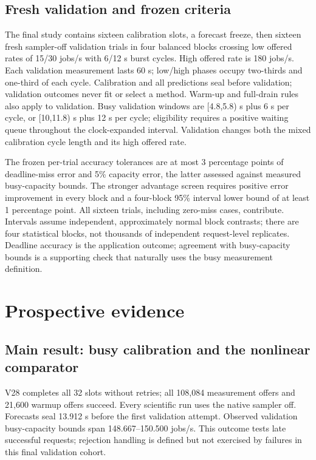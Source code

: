 \documentclass[11pt,a4paper]{article}
\begin{document}
\subsection{Fresh validation and frozen criteria}

The final study contains sixteen calibration slots, a forecast freeze, then
sixteen fresh sampler-off validation trials in four balanced blocks crossing
low offered rates of 15/30 jobs/s with 6/12 s burst cycles. High offered rate
is 180 jobs/s. Each validation measurement lasts 60 s; low/high phases occupy
two-thirds and one-third of each cycle. Calibration and all predictions seal
before validation; validation outcomes never fit or select a method. Warm-up and full-drain
rules also apply to validation. Busy validation windows are [4.8,5.8) s
plus 6 s per cycle, or [10,11.8) s plus 12 s per cycle; eligibility requires
a positive waiting queue throughout the clock-expanded interval. Validation
changes both the mixed calibration cycle length and its high offered rate.

The frozen per-trial accuracy tolerances are at most 3 percentage points of
deadline-miss error and 5\% capacity error, the latter assessed against measured
busy-capacity bounds. The stronger advantage screen requires positive error
improvement in every block and a four-block 95\% interval lower bound of at
least 1 percentage point. All sixteen trials, including zero-miss cases,
contribute. Intervals assume independent, approximately normal block
contrasts; there are four statistical blocks, not thousands of independent
request-level replicates. Deadline accuracy is the application outcome;
agreement with busy-capacity bounds is a supporting check that naturally
uses the busy measurement definition.

\section{Prospective evidence}

\subsection{Main result: busy calibration and the nonlinear comparator}

V28 completes all 32 slots without retries; all 108,084 measurement offers
and 21,600 warmup offers succeed. Every scientific run uses the native sampler
off. Forecasts seal 13.912 s before the first validation attempt. Observed
validation busy-capacity bounds span 148.667–150.500 jobs/s. This outcome
tests late successful requests; rejection handling is defined but not exercised
by failures in this final validation cohort.
\end{document}
